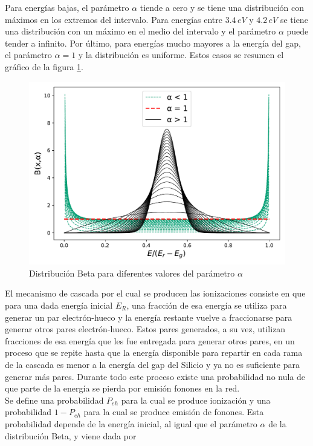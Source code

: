 Para energías bajas, el parámetro $\alpha$ tiende a cero y se tiene una distribución con máximos en los extremos del intervalo. Para energías entre $3.4\,\si{eV}$ y $4.2\,\si{eV}$ se tiene una distribución con un máximo en el medio del intervalo y el parámetro $\alpha$ puede tender a infinito. Por último, para energías mucho mayores a la energía del gap, el parámetro $\alpha = 1$ y la distribución es uniforme. Estos casos se resumen el gráfico de la figura \ref{fig:BetaDist}.
\begin{figure}%
    \centering
    \includegraphics[scale=.7]{Figs/BetaDistFig.pdf}
    \caption{\footnotesize{Distribución Beta para diferentes valores del parámetro $\alpha$}}
    \label{fig:BetaDist}
\end{figure}
El mecanismo de cascada por el cual se producen las ionizaciones consiste en que para una dada energía inicial $E_{R}$, una fracción de esa energía se utiliza para generar un par electrón-hueco y la energía restante vuelve a fraccionarse para generar otros pares electrón-hueco. Estos pares generados, a su vez, utilizan fracciones de esa energía que les fue entregada para generar otros pares, en un proceso que se repite hasta que la energía disponible para repartir en cada rama de la cascada es menor a la energía del gap del Silicio y ya no es suficiente para generar más pares. Durante todo este proceso existe una probabilidad no nula de que parte de la energía se pierda por emisión fonones en la red.\\
\indent Se define una probabilidad $P_{eh}$ para la cual se produce ionización y una probabilidad $1 - P_{eh}$ para la cual se produce emisión de fonones. Esta probabilidad depende de la energía inicial, al igual que el parámetro $\alpha$ de la distribución Beta, y viene dada por
